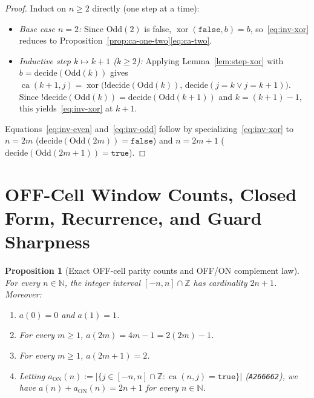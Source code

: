 \documentclass[11pt]{article}
\newtheorem{proposition}[theorem]{Proposition}
\theoremstyle{definition}
\newcommand{\N}{\mathbb{N}}
\newcommand{\Z}{\mathbb{Z}}
\newcommand{\seq}[1]{\texttt{#1}}
\newcommand{\ca}{\operatorname{ca}}
\begin{document}
\begin{proof}
Induct on $n \ge 2$ directly (one step at a time):
\begin{itemize}
\item \emph{Base case $n = 2$:} Since $\mathrm{Odd}(2)$ is false, $\operatorname{xor}(\mathtt{false}, b) = b$, so~\eqref{eq:inv-xor} reduces to Proposition~\ref{prop:ca-one-two}\eqref{eq:ca-two}.
\item \emph{Inductive step $k \mapsto k + 1$ ($k \ge 2$):} Applying Lemma~\ref{lem:step-xor} with $b = \mathrm{decide}(\mathrm{Odd}(k))$ gives $\ca(k + 1, j) = \operatorname{xor}\bigl(!\mathrm{decide}(\mathrm{Odd}(k)),\, \mathrm{decide}(j = k \lor j = k + 1)\bigr)$. Since $!\mathrm{decide}(\mathrm{Odd}(k)) = \mathrm{decide}(\mathrm{Odd}(k + 1))$ and $k = (k + 1) - 1$, this yields~\eqref{eq:inv-xor} at $k + 1$.
\end{itemize}
Equations~\eqref{eq:inv-even} and~\eqref{eq:inv-odd} follow by specializing~\eqref{eq:inv-xor} to $n = 2m$ ($\mathrm{decide}(\mathrm{Odd}(2m)) = \mathtt{false}$) and $n = 2m + 1$ ($\mathrm{decide}(\mathrm{Odd}(2m + 1)) = \mathtt{true}$).
\end{proof}

\section{OFF-Cell Window Counts, Closed Form, Recurrence, and Guard Sharpness}

\begin{proposition}[Exact OFF-cell parity counts and OFF/ON complement law]
\label{prop:counts}
For every $n \in \N$, the integer interval $[-n, n] \cap \Z$ has cardinality $2n + 1$. Moreover:
\begin{enumerate}
\item[\textup{(a)}] $a(0) = 0$ and $a(1) = 1$.
\item[\textup{(b)}] For every $m \ge 1$, $a(2m) = 4m - 1 = 2(2m) - 1$.
\item[\textup{(c)}] For every $m \ge 1$, $a(2m + 1) = 2$.
\item[\textup{(d)}] Letting $a_{\mathrm{ON}}(n) := |\{j \in [-n, n] \cap \Z : \ca(n, j) = \mathtt{true}\}|$ (\seq{A266662}), we have $a(n) + a_{\mathrm{ON}}(n) = 2n + 1$ for every $n \in \N$.
\end{enumerate}
\end{proposition}
\end{document}
